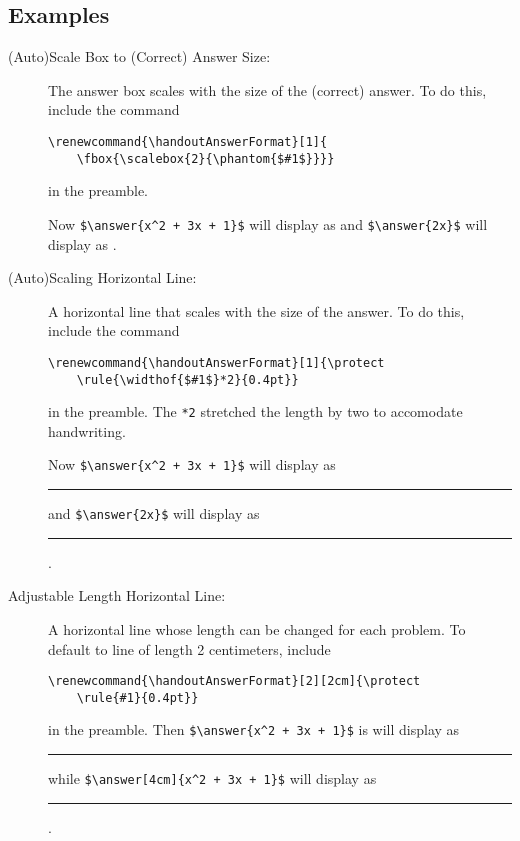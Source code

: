 \documentclass{ximera}
\begin{document}
    \subsection*{Examples}
        \begin{description}
            \item[(Auto)Scale Box to (Correct) Answer Size:] The answer box scales with the size of the (correct) answer. To do this, include the command 
            \begin{verbatim}
\renewcommand{\handoutAnswerFormat}[1]{
    \fbox{\scalebox{2}{\phantom{$#1$}}}}
            \end{verbatim}
            in the preamble. 
            
            Now \verb|$\answer{x^2 + 3x + 1}$| will display as \fbox{\scalebox{2}{\phantom{$x^2 + 3x + 1$}}} and \verb|$\answer{2x}$| will display as \fbox{\scalebox{2}{\phantom{$2x$}}}.
                
            \item[(Auto)Scaling Horizontal Line:] A horizontal line that scales with the size of the answer. To do this, include the command 
            \begin{verbatim}
\renewcommand{\handoutAnswerFormat}[1]{\protect
    \rule{\widthof{$#1$}*2}{0.4pt}}
            \end{verbatim}
            in the preamble. The \verb|*2| stretched the length by two to accomodate handwriting.

            Now \verb|$\answer{x^2 + 3x + 1}$| will display as
            \rule{*2}{0.4pt} and \verb|$\answer{2x}$| will display as \rule{*2}{0.4pt}.

            \item[Adjustable Length Horizontal Line:] A horizontal line whose length can be changed for each problem. To default to line of length 2 centimeters, include 
            \begin{verbatim}
\renewcommand{\handoutAnswerFormat}[2][2cm]{\protect
    \rule{#1}{0.4pt}}
            \end{verbatim}
            in the preamble. Then \verb|$\answer{x^2 + 3x + 1}$| is   will display as \rule{2 cm}{0.4pt} while \verb|$\answer[4cm]{x^2 + 3x + 1}$| will display as \rule{4cm}{0.4pt}.
        \end{description}
    
                

    
\end{document}
